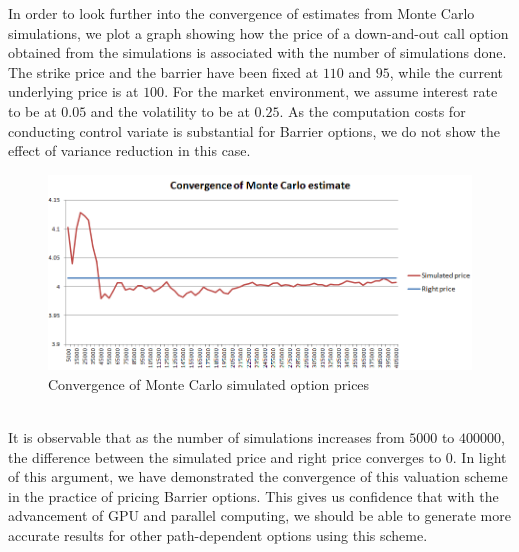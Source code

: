 In order to look further into the convergence of estimates from Monte Carlo simulations, we plot a graph showing how the price of a down-and-out call option obtained from the simulations is associated with the number of simulations done. The strike price and the barrier have been fixed at $110$ and $95$, while the current underlying price is at $100$. For the market environment, we assume interest rate to be at $0.05$ and the volatility to be at $0.25$. As the computation costs for conducting control variate is substantial for Barrier options, we do not show the effect of variance reduction in this case.
\begin{figure}[h]
      \centering
	\includegraphics[scale=0.45]{barrierMonteCarloConvergence.png}
      \caption{Convergence of Monte Carlo simulated option prices}
\end{figure}
\\It is observable that as the number of simulations increases from $5000$ to $400000$, the difference between the simulated price and right price converges to 0. In light of this argument, we have demonstrated the convergence of this valuation scheme in the practice of pricing Barrier options. This gives us confidence that with the advancement of GPU and parallel computing, we should be able to generate more accurate results for other path-dependent options using this scheme.
\newpage

